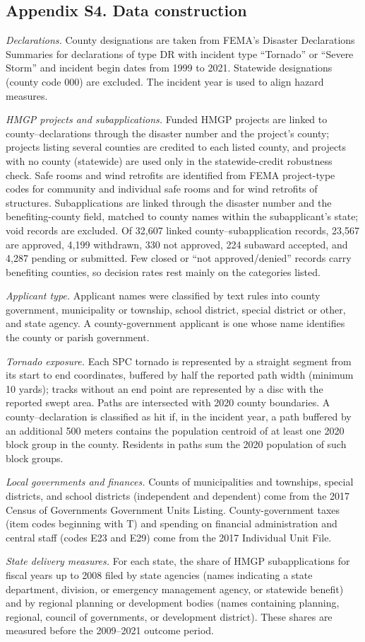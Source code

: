 \subsection*{Appendix S4. Data construction}

\textit{Declarations.} County designations are taken from FEMA's Disaster Declarations Summaries for declarations of type DR with incident type ``Tornado'' or ``Severe Storm'' and incident begin dates from 1999 to 2021. Statewide designations (county code 000) are excluded. The incident year is used to align hazard measures.

\textit{HMGP projects and subapplications.} Funded HMGP projects are linked to county--declarations through the disaster number and the project's county; projects listing several counties are credited to each listed county, and projects with no county (statewide) are used only in the statewide-credit robustness check. Safe rooms and wind retrofits are identified from FEMA project-type codes for community and individual safe rooms and for wind retrofits of structures. Subapplications are linked through the disaster number and the benefiting-county field, matched to county names within the subapplicant's state; void records are excluded. Of 32,607 linked county--subapplication records, 23,567 are approved, 4,199 withdrawn, 330 not approved, 224 subaward accepted, and 4,287 pending or submitted. Few closed or ``not approved/denied'' records carry benefiting counties, so decision rates rest mainly on the categories listed.

\textit{Applicant type.} Applicant names were classified by text rules into county government, municipality or township, school district, special district or other, and state agency. A county-government applicant is one whose name identifies the county or parish government.

\textit{Tornado exposure.} Each SPC tornado is represented by a straight segment from its start to end coordinates, buffered by half the reported path width (minimum 10 yards); tracks without an end point are represented by a disc with the reported swept area. Paths are intersected with 2020 county boundaries. A county--declaration is classified as hit if, in the incident year, a path buffered by an additional 500 meters contains the population centroid of at least one 2020 block group in the county. Residents in paths sum the 2020 population of such block groups.

\textit{Local governments and finances.} Counts of municipalities and townships, special districts, and school districts (independent and dependent) come from the 2017 Census of Governments Government Units Listing. County-government taxes (item codes beginning with T) and spending on financial administration and central staff (codes E23 and E29) come from the 2017 Individual Unit File.

\textit{State delivery measures.} For each state, the share of HMGP subapplications for fiscal years up to 2008 filed by state agencies (names indicating a state department, division, or emergency management agency, or statewide benefit) and by regional planning or development bodies (names containing planning, regional, council of governments, or development district). These shares are measured before the 2009--2021 outcome period.

